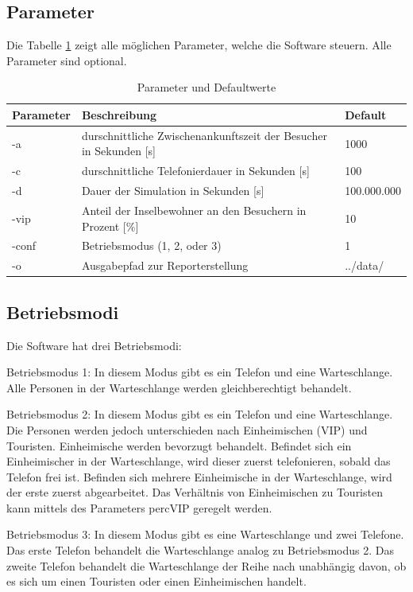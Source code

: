 \subsection{Parameter}
Die Tabelle \ref{tab:parameter} zeigt alle möglichen Parameter, welche die Software steuern. Alle Parameter sind optional.
\begin{table}[htpb]
	\centering
	\begin{tabular}{lll}
		Parameter & Beschreibung  &  Default\\ \hline
		-a & durschnittliche Zwischenankunftszeit der Besucher in Sekunden [s] & 1000 \\
		-c & durschnittliche Telefonierdauer in Sekunden [s] & 100 \\
		-d & Dauer der Simulation in Sekunden [s] & 100.000.000 \\
		-vip & Anteil der Inselbewohner an den Besuchern in Prozent [\%] &  10 \\
		-conf & Betriebsmodus (1, 2, oder 3) & 1 \\
		-o & Ausgabepfad zur Reporterstellung & ../data/
	\end{tabular}
	\caption{Parameter und Defaultwerte}
	\label{tab:parameter}
\end{table}


\subsection{Betriebsmodi}
Die Software hat drei Betriebsmodi:
\begin{list}{}
	\item Betriebsmodus 1: In diesem Modus gibt es ein Telefon und eine Warteschlange. Alle Personen in der Warteschlange werden gleichberechtigt behandelt.
	\item Betriebsmodus 2: In diesem Modus gibt es ein Telefon und eine Warteschlange. Die Personen werden jedoch unterschieden nach Einheimischen (VIP) und Touristen. Einheimische werden bevorzugt behandelt. Befindet sich ein Einheimischer in der Warteschlange, wird dieser zuerst telefonieren, sobald das Telefon frei ist. Befinden sich mehrere Einheimische in der Warteschlange, wird der erste zuerst abgearbeitet. Das Verhältnis von Einheimischen zu Touristen kann mittels des Parameters percVIP geregelt werden.
	\item Betriebsmodus 3: In diesem Modus gibt es eine Warteschlange und zwei Telefone. Das erste Telefon behandelt die Warteschlange analog zu Betriebsmodus 2. Das zweite Telefon behandelt die Warteschlange der Reihe nach unabhängig davon, ob es sich um einen Touristen oder einen Einheimischen handelt.
\end{list}

